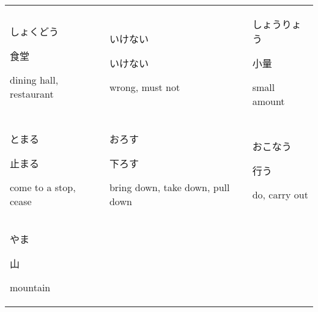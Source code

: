 \documentclass[12pt, a4j, landscape, dvipdfmx]{utarticle}
\begin{document}
    
    \begin{minipage}[t][0pt]{\linewidth }
        \noindent 
        \begin{tabular}{||p{5.5cm}||p{5.5cm}||p{5.5cm}||}
            \hhline{|t:=:t:=:t:=:t|} \rule{0pt}{3ex} \hspace*{-.4cm} {\LARGE しょくどう}\newline \rule{0pt}{3ex} \hspace*{.4cm} {\small 食堂}\newline \rule{0pt}{3ex} \hspace*{.425cm} {\small dining hall, restaurant}&\rule{0pt}{3ex} \hspace*{-.4cm} {\LARGE いけない}\newline \rule{0pt}{3ex} \hspace*{.4cm} {\small いけない}\newline \rule{0pt}{3ex} \hspace*{.425cm} {\small wrong, must not}&\rule{0pt}{3ex} \hspace*{-.4cm} {\LARGE しょうりょう}\newline \rule{0pt}{3ex} \hspace*{.4cm} {\small 小量}\newline \rule{0pt}{3ex} \hspace*{.425cm} {\small small amount}\tabularnewline \hhline{|:=::=::=:|} \rule{0pt}{3ex} \hspace*{-.4cm} {\LARGE とまる}\newline \rule{0pt}{3ex} \hspace*{.4cm} {\small 止まる}\newline \rule{0pt}{3ex} \hspace*{.425cm} {\small come to a stop, cease}&\rule{0pt}{3ex} \hspace*{-.4cm} {\LARGE おろす}\newline \rule{0pt}{3ex} \hspace*{.4cm} {\small 下ろす}\newline \rule{0pt}{3ex} \hspace*{.425cm} {\small bring down, take down, pull down}&\rule{0pt}{3ex} \hspace*{-.4cm} {\LARGE おこなう}\newline \rule{0pt}{3ex} \hspace*{.4cm} {\small 行う}\newline \rule{0pt}{3ex} \hspace*{.425cm} {\small do, carry out}\tabularnewline \hhline{|:=::=::=:|} \rule{0pt}{3ex} \hspace*{-.4cm} {\LARGE やま}\newline \rule{0pt}{3ex} \hspace*{.4cm} {\small 山}\newline \rule{0pt}{3ex} \hspace*{.425cm} {\small mountain}&\rule{0pt}{3ex} \hspace*{-.4cm} {\LARGE 
\end{tabular}
\end{minipage}
\end{document}

